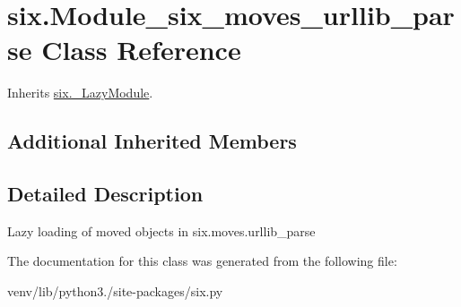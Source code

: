 \hypertarget{classsix_1_1_module__six__moves__urllib__parse}{}\section{six.\+Module\+\_\+six\+\_\+moves\+\_\+urllib\+\_\+parse Class Reference}
\label{classsix_1_1_module__six__moves__urllib__parse}


Inherits \hyperlink{classsix_1_1___lazy_module}{six.\+\_\+\+Lazy\+Module}.

\subsection*{Additional Inherited Members}


\subsection{Detailed Description}
\begin{DoxyVerb}Lazy loading of moved objects in six.moves.urllib_parse\end{DoxyVerb}
 

The documentation for this class was generated from the following file\+:\begin{DoxyCompactItemize}
\item 
venv/lib/python3./site-\/packages/six.\+py\end{DoxyCompactItemize}

